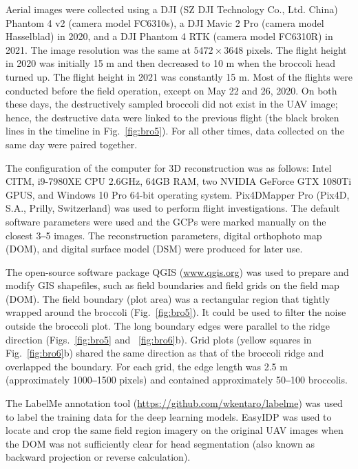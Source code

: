 Aerial images were collected using a DJI (SZ DJI Technology Co., Ltd. China) Phantom 4 v2 (camera model FC6310s), a DJI Mavic 2 Pro (camera model Hasselblad) in 2020, and a DJI Phantom 4 RTK (camera model FC6310R) in 2021. The image resolution was the same at $5472 \times 3648$ pixels. The flight height in 2020 was initially 15 m and then decreased to 10 m when the broccoli head turned up. The flight height in 2021 was constantly 15 m. Most of the flights were conducted before the field operation, except on May 22 and 26, 2020. On both these days, the destructively sampled broccoli did not exist in the UAV image; hence, the destructive data were linked to the previous flight (the black broken lines in the timeline in Fig.~\ref{fig:bro5}). For all other times, data collected on the same day were paired together.

The configuration of the computer for 3D reconstruction was as follows: Intel CITM, i9-7980XE CPU \@2.6GHz, 64GB RAM, two NVIDIA GeForce GTX 1080Ti GPUS, and Windows 10 Pro 64-bit operating system. Pix4DMapper Pro (Pix4D, S.A., Prilly, Switzerland) was used to perform flight investigations. The default software parameters were used and the GCPs were marked manually on the closest 3‒5 images. The reconstruction parameters, digital orthophoto map (DOM), and digital surface model (DSM) were produced for later use. 

The open-source software package QGIS (\url{www.qgis.org}) was used to prepare and modify GIS shapefiles, such as field boundaries and field grids on the field map (DOM). The field boundary (plot area) was a rectangular region that tightly wrapped around the broccoli (Fig.~\ref{fig:bro5}). It could be used to filter the noise outside the broccoli plot. The long boundary edges were parallel to the ridge direction (Figs.~\ref{fig:bro5} and ~\ref{fig:bro6}b). Grid plots (yellow squares in Fig.~\ref{fig:bro6}b) shared the same direction as that of the broccoli ridge and overlapped the boundary. For each grid, the edge length was 2.5 m (approximately 1000‒1500 pixels) and contained approximately 50‒100 broccolis. 



The LabelMe annotation tool (\url{https://github.com/wkentaro/labelme}) was used to label the training data for the deep learning models. EasyIDP \citep[\url{https://github.com/UTokyo-FieldPhenomics-Lab/EasyIDP}]{wang_easyidp_2021} was used to locate and crop the same field region imagery on the original UAV images when the DOM was not sufficiently clear for head segmentation (also known as backward projection or reverse calculation).

